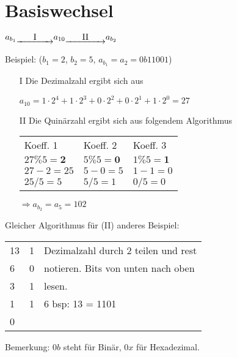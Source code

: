 \section{Basiswechsel}
\begin{center}
	$a_{b_1} \underrightarrow{\text{\qquad I\qquad}} a_{10} \underrightarrow{\text{\qquad II\qquad}} a_{b_2}$
\end{center}
Beispiel: ($b_1 = 2$, $b_2 = 5$, $a_{b_1} = a_2 = 0b11001$)
\begin{itemize}
	\item[I] Die Dezimalzahl ergibt sich aus
	\item[] $a_{10} = 1\cdot2^4 + 1\cdot2^3 + 0\cdot2^2 + 0\cdot2^1 + 1\cdot2^0 = 27$ 
	\item[II] Die Quinärzahl ergibt sich aus folgendem Algorithmus
	\begin{center}
		\begin{tabular}{lll}
		Koeff. 1 & Koeff. 2 & Koeff. 3\\
		$27 \% 5 = \textbf{2}$ & $5\%5 = \textbf{0}$ & $1\%5 = \textbf{1}$ \\
		$27 - 2 = 25$ & $5 - 0 = 5$ & $1 -1 = 0 $\\
		$25/5 = 5$ & $5/5 = 1$ & $0/5 = 0$ \\
	\end{tabular}
	\end{center}
$\Rightarrow a_{b_2} = a_5 = 1 0 2$
\end{itemize}
Gleicher Algorithmus für (II) anderes Beispiel:
\begin{center}
	\begin{tabular}{ lll } 
	13	&	1	& Dezimalzahl durch 2 teilen und rest\\
	6	& 	0	& notieren. Bits von unten nach oben\\
	3	&	1	& lesen.\\
	1	&	1	&6 bsp: 13 = 1101\\
	0 & & \\
	\end{tabular}
Bemerkung: $0b$ steht für Binär, $0x$ für Hexadezimal.
\end{center}























